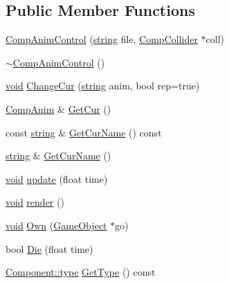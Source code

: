\subsection*{Public Member Functions}
\begin{DoxyCompactItemize}
\item 
\hyperlink{class_comp_anim_control_a973d5ec96115727a84968388bcbe7b7c}{Comp\-Anim\-Control} (\hyperlink{_s_d_l__opengl__glext_8h_ae84541b4f3d8e1ea24ec0f466a8c568b}{string} file, \hyperlink{class_comp_collider}{Comp\-Collider} $\ast$coll)
\item 
\hyperlink{class_comp_anim_control_a6786dbe926d75c85dd4e8bc89ba6525a}{$\sim$\-Comp\-Anim\-Control} ()
\item 
\hyperlink{_s_d_l__opengles2__gl2ext_8h_ae5d8fa23ad07c48bb609509eae494c95}{void} \hyperlink{class_comp_anim_control_a34e3519f9bedde639fdd4342da644d51}{Change\-Cur} (\hyperlink{_s_d_l__opengl__glext_8h_ae84541b4f3d8e1ea24ec0f466a8c568b}{string} anim, bool rep=true)
\item 
\hyperlink{class_comp_anim}{Comp\-Anim} \& \hyperlink{class_comp_anim_control_af094714708b9851b117dd6e3d837213b}{Get\-Cur} ()
\item 
const \hyperlink{_s_d_l__opengl__glext_8h_ae84541b4f3d8e1ea24ec0f466a8c568b}{string} \& \hyperlink{class_comp_anim_control_aab22a377f8848fe448d801e4d23266f2}{Get\-Cur\-Name} () const 
\item 
\hyperlink{_s_d_l__opengl__glext_8h_ae84541b4f3d8e1ea24ec0f466a8c568b}{string} \& \hyperlink{class_comp_anim_control_a4d1597b040731483f5d744feac77f19a}{Get\-Cur\-Name} ()
\item 
\hyperlink{_s_d_l__opengles2__gl2ext_8h_ae5d8fa23ad07c48bb609509eae494c95}{void} \hyperlink{class_comp_anim_control_a30942bb6ac00771fe7c517ea64096d65}{update} (float time)
\item 
\hyperlink{_s_d_l__opengles2__gl2ext_8h_ae5d8fa23ad07c48bb609509eae494c95}{void} \hyperlink{class_comp_anim_control_a2b23ff1dc6a0748ed5a7fadb07bb8bbb}{render} ()
\item 
\hyperlink{_s_d_l__opengles2__gl2ext_8h_ae5d8fa23ad07c48bb609509eae494c95}{void} \hyperlink{class_comp_anim_control_a5a4ad75cc577d413fdaa4753d64e8d8c}{Own} (\hyperlink{class_game_object}{Game\-Object} $\ast$go)
\item 
bool \hyperlink{class_comp_anim_control_a88db8f36cc8a393770bb71d743a296e2}{Die} (float time)
\item 
\hyperlink{class_component_ad6d161b6acf7b843b55bb9feac7af71a}{Component\-::type} \hyperlink{class_comp_anim_control_adaed169358aac3d66d8d543ca36817c4}{Get\-Type} () const 
\end{DoxyCompactItemize}
